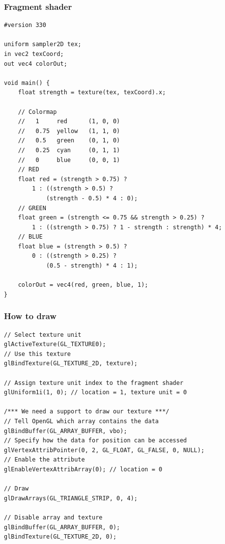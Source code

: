 \begin{frame}[fragile]

\frametitle{Fragment shader}

\begin{lstlisting}[basicstyle=\fontsize{7pt}{8pt}\ttfamily]
#version 330

uniform sampler2D tex;
in vec2 texCoord;
out vec4 colorOut;

void main() {
    float strength = texture(tex, texCoord).x;

    // Colormap
    //   1     red      (1, 0, 0)
    //   0.75  yellow   (1, 1, 0)
    //   0.5   green    (0, 1, 0)
    //   0.25  cyan     (0, 1, 1)
    //   0     blue     (0, 0, 1)
    // RED
    float red = (strength > 0.75) ?
        1 : ((strength > 0.5) ?
            (strength - 0.5) * 4 : 0);
    // GREEN
    float green = (strength <= 0.75 && strength > 0.25) ?
        1 : ((strength > 0.75) ? 1 - strength : strength) * 4;
    // BLUE
    float blue = (strength > 0.5) ?
        0 : ((strength > 0.25) ?
            (0.5 - strength) * 4 : 1);

    colorOut = vec4(red, green, blue, 1);
}
\end{lstlisting}

\end{frame}

\begin{frame}[fragile]

\frametitle{How to draw}

\begin{lstlisting}
// Select texture unit
glActiveTexture(GL_TEXTURE0);
// Use this texture
glBindTexture(GL_TEXTURE_2D, texture);

// Assign texture unit index to the fragment shader
glUniform1i(1, 0); // location = 1, texture unit = 0

/*** We need a support to draw our texture ***/
// Tell OpenGL which array contains the data
glBindBuffer(GL_ARRAY_BUFFER, vbo);
// Specify how the data for position can be accessed
glVertexAttribPointer(0, 2, GL_FLOAT, GL_FALSE, 0, NULL);
// Enable the attribute
glEnableVertexAttribArray(0); // location = 0

// Draw
glDrawArrays(GL_TRIANGLE_STRIP, 0, 4);

// Disable array and texture
glBindBuffer(GL_ARRAY_BUFFER, 0);
glBindTexture(GL_TEXTURE_2D, 0);
\end{lstlisting}

\end{frame}

